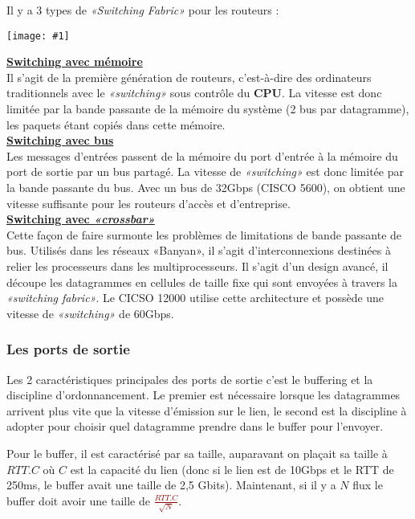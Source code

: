 \documentclass{article}
\newcommand{\dred}[1]{\textcolor{darkred}{\textbf{#1}}}
\newcommand{\imgR}[2]{\begin{center}\texttt{[image: \#1]}\end{center}}
\begin{document}
Il y a 3 types de \textit{«Switching Fabric»} pour les routeurs : 

\imgR{CN_075.png}{300}

\textbf{\underline{Switching avec mémoire}} \\

Il s'agit de la première génération de routeurs, c'est-à-dire des ordinateurs traditionnels avec le 
\textit{«switching»} sous contrôle du \textbf{CPU}. La vitesse est donc limitée par la bande passante de la 
mémoire du système (2 bus par datagramme), les paquets étant copiés dans cette mémoire. \\
\newpage
\textbf{\underline{Switching avec bus}} \\

Les messages d'entrées passent de la mémoire du port d'entrée à la mémoire du port de sortie par un bus partagé.
La vitesse de \textit{«switching»} est donc limitée par la bande passante du bus. Avec un bus de 32Gbps (CISCO 
5600), on obtient une vitesse suffisante pour les routeurs d'accès et d'entreprise.\\

\textbf{\underline{Switching avec \textit{«crossbar»}}} \\

Cette façon de faire surmonte les problèmes de limitations de bande passante de bus. Utilisés dans les réseaux
«Banyan», il s'agit d'interconnexions destinées à relier les processeurs dans les multiprocesseurs. Il s'agit 
d'un design avancé, il découpe les datagrammes en cellules de taille fixe qui sont envoyées à travers la 
\textit{«switching fabric»}. Le CICSO 12000 utilise cette architecture et possède une vitesse de 
\textit{«switching»} de 60Gbps.

\subsubsection{Les ports de sortie}

Les 2 caractéristiques principales des ports de sortie c'est le buffering et la discipline d'ordonnancement. Le
premier est nécessaire lorsque les datagrammes arrivent plus vite que la vitesse d'émission sur le lien, le 
second est la discipline à adopter pour choisir quel datagramme prendre dans le buffer pour l'envoyer.

Pour le buffer, il est caractérisé par sa taille, auparavant on plaçait sa taille à $RTT.C$ où $C$ est la 
capacité du lien (donc si le lien est de 10Gbps et le RTT de 250ms, le buffer avait une taille de 2,5 Gbits). 
Maintenant, si il y a $N$ flux le buffer doit avoir une taille de \dred{$\frac{RTT.C}{\sqrt{N}}$}.
\end{document}
